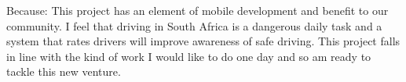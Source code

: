 \spacedhrule{1.6em}{-0.4em}  
  

\inlineheadsection
  {Because:}
  {This project has an element of mobile development and benefit to our community. I feel that driving in South Africa is a dangerous daily task and a system that rates drivers will improve awareness of safe driving. This project falls in line with the kind of work I would like to do one day and so am ready to tackle this new venture.}